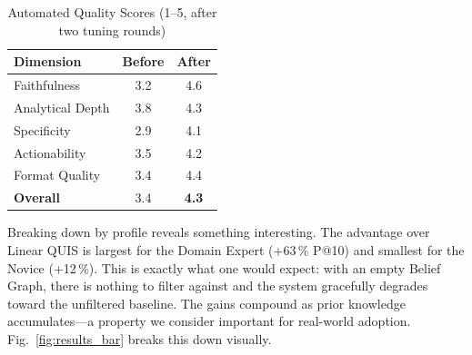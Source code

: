 \documentclass[conference]{IEEEtran}
\begin{document}
\begin{table}[htbp]
  \centering
  \caption{Automated Quality Scores (1--5, after two tuning rounds)}
  \label{tab:quality}
  \begin{tabular}{@{}lcc@{}}
    \toprule
    \textbf{Dimension}   & \textbf{Before} & \textbf{After} \\
    \midrule
    Faithfulness         & 3.2             & 4.6            \\
    Analytical Depth     & 3.8             & 4.3            \\
    Specificity          & 2.9             & 4.1            \\
    Actionability        & 3.5             & 4.2            \\
    Format Quality       & 3.4             & 4.4            \\
    \midrule
    \textbf{Overall}     & 3.4             & \textbf{4.3}   \\
    \bottomrule
  \end{tabular}
\end{table}

Breaking down by profile reveals something interesting. The advantage
over Linear QUIS is largest for the Domain Expert (+63\,\% P@10) and
smallest for the Novice (+12\,\%). This is exactly what one would
expect: with an empty Belief Graph, there is nothing to filter against
and the system gracefully degrades toward the unfiltered baseline.
The gains compound as prior knowledge accumulates---a property we
consider important for real-world adoption. Fig.~\ref{fig:results_bar}
breaks this down visually.
\end{document}
